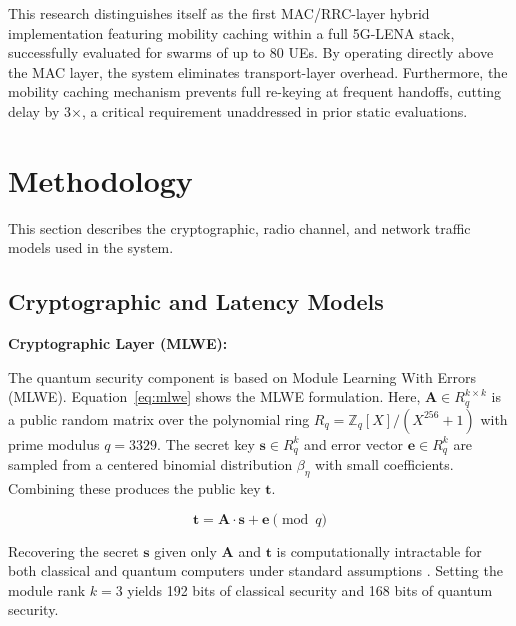 \documentclass{ieeeaccess}
\begin{document}
This research distinguishes itself as the first MAC/RRC-layer hybrid implementation featuring mobility caching within a full 5G-LENA stack, successfully evaluated for swarms of up to 80 UEs. By operating directly above the MAC layer, the system eliminates transport-layer overhead. Furthermore, the mobility caching mechanism prevents full re-keying at frequent handoffs, cutting delay by 3$\times$, a critical requirement unaddressed in prior static evaluations.

\section{Methodology}
\label{sec:methodology}

This section describes the cryptographic, radio channel, and network traffic models used in the system.

\subsection{Cryptographic and Latency Models}
\noindent\textbf{Cryptographic Layer (MLWE):}

The quantum security component is based on Module Learning With Errors (MLWE). Equation~\ref{eq:mlwe} shows the MLWE formulation. Here, $\mathbf{A} \in R_q^{k \times k}$ is a public random matrix over the polynomial ring $R_q = \mathbb{Z}_q[X]/(X^{256}+1)$ with prime modulus $q = 3329$. The secret key $\mathbf{s} \in R_q^k$ and error vector $\mathbf{e} \in R_q^k$ are sampled from a centered binomial distribution $\beta_\eta$ with small coefficients. Combining these produces the public key $\mathbf{t}$.

\begin{equation}
\mathbf{t} = \mathbf{A} \cdot \mathbf{s} + \mathbf{e} \pmod{q}
\label{eq:mlwe}
\end{equation}

Recovering the secret $\mathbf{s}$ given only $\mathbf{A}$ and $\mathbf{t}$ is computationally intractable for both classical and quantum computers under standard assumptions \cite{ref6}. Setting the module rank $k = 3$ yields 192 bits of classical security and 168 bits of quantum security.
\end{document}
